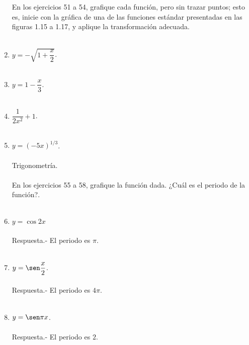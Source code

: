 \begin{enumerate}[\bfseries 1.]
\begin{enumerate}[\bfseries a)]
\end{enumerate}
En los ejercicios 51 a 54, grafique cada función, pero sin trazar puntos; esto es, inicie con la gráfica de una de las funciones estándar presentadas en las figuras 1.15 a 1.17, y aplique la transformación adecuada.\\\\

\item $y = - \sqrt{1 + \dfrac{x}{2}}$.\\\\

\item $y = 1 - \dfrac{x}{3}$.\\\\

\item $\dfrac{1}{2x^2} + 1$.\\\\

\item $y = (-5x)^{1/3}$.\\\\

Trigonometría.\\\\
En los ejercicios 55 a 58, grafique la función dada. ¿Cuál es el periodo de la función?.\\\\

\item $y = \cos 2x$\\\\
    Respuesta.-\; El periodo es $\pi$.\\\\

\item $y = \sen \dfrac{x}{2}$.\\\\
    Respuesta.-\; El periodo es $4\pi$.\\\\

\item $y = \sen \pi x$.\\\\
    Respuesta.-\; El periodo es $2$.\\\\


\end{enumerate}

